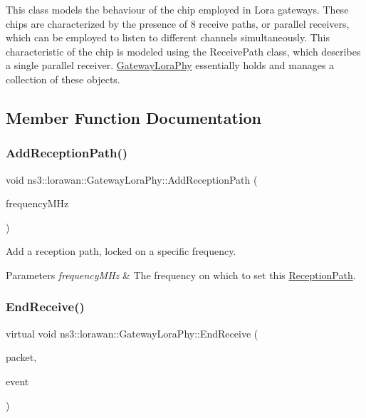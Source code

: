 This class models the behaviour of the chip employed in Lora gateways. These chips are characterized by the presence of 8 receive paths, or parallel receivers, which can be employed to listen to different channels simultaneously. This characteristic of the chip is modeled using the Receive\+Path class, which describes a single parallel receiver. \hyperlink{classns3_1_1lorawan_1_1GatewayLoraPhy}{Gateway\+Lora\+Phy} essentially holds and manages a collection of these objects. 

\subsection{Member Function Documentation}
\mbox{\label{classns3_1_1lorawan_1_1GatewayLoraPhy_a5587bc3145215aad3faa2b522db5595b}} 
\subsubsection{\texorpdfstring{Add\+Reception\+Path()}{AddReceptionPath()}}
{\footnotesize\ttfamily void ns3\+::lorawan\+::\+Gateway\+Lora\+Phy\+::\+Add\+Reception\+Path (\begin{DoxyParamCaption}\item[{double}]{frequency\+M\+Hz }\end{DoxyParamCaption})}

Add a reception path, locked on a specific frequency.


\begin{DoxyParams}{Parameters}
{\em frequency\+M\+Hz} & The frequency on which to set this \hyperlink{classns3_1_1lorawan_1_1GatewayLoraPhy_1_1ReceptionPath}{Reception\+Path}. \\
\hline
\end{DoxyParams}
\mbox{\label{classns3_1_1lorawan_1_1GatewayLoraPhy_a030500acf630f508b12923627cdc4068}} 
\subsubsection{\texorpdfstring{End\+Receive()}{EndReceive()}}
{\footnotesize\ttfamily virtual void ns3\+::lorawan\+::\+Gateway\+Lora\+Phy\+::\+End\+Receive (\begin{DoxyParamCaption}\item[{Ptr$<$ Packet $>$}]{packet,  }\item[{Ptr$<$ \hyperlink{classns3_1_1lorawan_1_1LoraInterferenceHelper_1_1Event}{Lora\+Interference\+Helper\+::\+Event} $>$}]{event }\end{DoxyParamCaption})\hspace{0.3cm}{\ttfamily [pure virtual]}}


